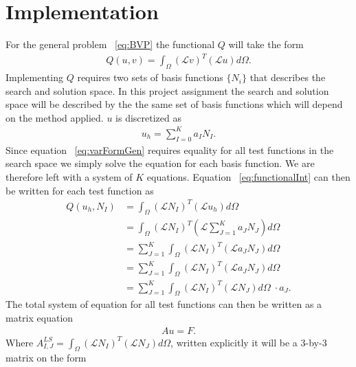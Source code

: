 
\chapter{Implementation} %

\label{chap:Implementation} %



 For the general problem ~\ref{eq:BVP} the functional $Q$ will take the form 
\begin{align}
	Q(u,v)=\int_{\Omega}(\mathcal{L}v)^T(\mathcal{L}u)d\Omega.
	\label{eq:functionalInt}
\end{align}
Implementing $Q$ requires two sets of basis functions $\{N_i\}$ that describes the search and solution space. In this project assignment the search and solution space will be described by the the same set of basis functions which will depend on the method applied. $u$ is discretized as 
\begin{align}
	u_h = \sum_{I=0}^{K}a_IN_I.
	\label{eq:uDisc}
\end{align}
Since equation ~\ref{eq:varFormGen} requires equality for all test functions in the search space we simply solve the equation for each basis function. We are therefore left with a system of $K$ equations. Equation ~\ref{eq:functionalInt} can then be written for each test function as  
\begin{align}
	Q(u_h,N_I) &= \int_{\Omega}(\mathcal{L}N_I)^T(\mathcal{L}u_h)d\Omega \\
	&= \int_{\Omega}(\mathcal{L}N_I)^T(\mathcal{L}\sum_{J=1}^Ka_JN_J)d\Omega \\
	&= \sum_{J=1}^K\int_{\Omega}(\mathcal{L}N_I)^T(\mathcal{L}a_JN_J)d\Omega \\
	&= \sum_{J=1}^K\int_{\Omega}(\mathcal{L}N_I)^T(\mathcal{L}a_JN_J)d\Omega \\
	&= \sum_{J=1}^K\int_{\Omega}(\mathcal{L}N_I)^T(\mathcal{L}N_J)d\Omega \;\cdot a_J.
	\label{eq:varFormDisc}
\end{align}
The total system of equation for all test functions can then be written as a matrix equation 
\begin{align}
	Au = F.
	\label{eq:matrixEq}
\end{align}
Where $A^{LS}_{I,J}=\int_{\Omega}(\mathcal{L}N_I)^T(\mathcal{L}N_J)d\Omega$, written explicitly it will be a 3-by-3 matrix on the form 


